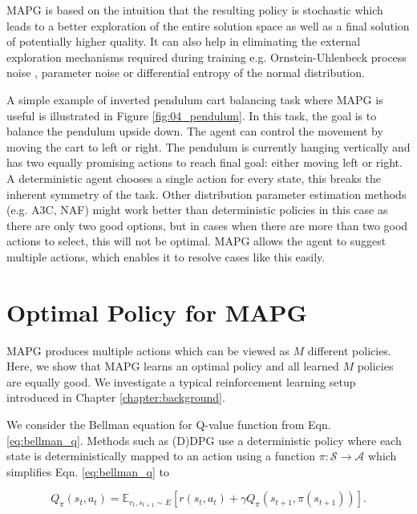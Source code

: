 MAPG is based on the intuition that the resulting policy is stochastic which leads to a better exploration of the entire solution space as well as a final solution of potentially higher quality. It can also help in eliminating the external exploration mechanisms required during training e.g. Ornstein-Uhlenbeck process noise \cite{ounoise}, parameter noise \cite{paramnoise} or differential entropy of the normal distribution.

A simple example of inverted pendulum cart balancing task where MAPG is useful is illustrated in Figure \ref{fig:04_pendulum}. In this task, the goal is to balance the pendulum upside down. The agent can control the movement by moving the cart to left or right. The pendulum is currently hanging vertically and has two equally promising actions to reach final goal: either moving left or right. A deterministic agent chooses a single action for every state, this breaks the inherent symmetry of the task. Other distribution parameter estimation methods (e.g. A3C, NAF) might work better than deterministic policies in this case as there are only two good options, but in cases when there are more than two good actions to select, this will not be optimal. MAPG allows the agent to suggest multiple actions, which enables it to resolve cases like this easily. 


\section{Optimal Policy for MAPG} \label{03:mapg_proof}
MAPG produces multiple actions which can be viewed as $M$ different policies. Here, we show that MAPG learns an optimal policy and all learned $M$ policies are equally good.
We investigate a typical reinforcement learning setup introduced in Chapter \ref{chapter:background}.

We consider the Bellman equation for Q-value function from Eqn. \ref{eq:bellman_q}. Methods such as (D)DPG use a deterministic policy where each state is deterministically mapped to an action using a function $\pi: \mathcal{S}\rightarrow\mathcal{A}$ which simplifies Eqn. \ref{eq:bellman_q} to

\begin{equation}\label{eq:deterministicbellman}
Q_\pi(s_t,a_t) = \mathbb{E}_{r_t,s_{t+1}\sim E}[r(s_t,a_t) + \gamma Q_\pi(s_{t+1},\pi(s_{t+1}))].
\end{equation}

